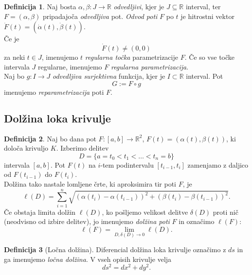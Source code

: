 \documentclass[11pt]{article}
\theoremstyle{definition}
\newtheorem{definicija}{Definicija}[section]
\theoremstyle{definition}
\theoremstyle{definition}
\theoremstyle{theorem}
\begin{document}
\begin{definicija}

Naj bosta $\alpha, \beta: J \rightarrow \mathbb{R}$ \textit{odvedljivi}, kjer je $J \subseteq \mathbb{R}$ interval, ter $F = (\alpha, \beta)$ pripadajoča \textit{odvedljiva} pot. \textit{Odvod poti} $F$ po $t$ je hitrostni vektor $\dot{F}(t) = (\dot{\alpha}(t), \dot{\beta}(t))$. \\
Če je 
$$\dot{F}(t) \neq (0, 0)$$ 
za neki $t \in J$, imenujemo $t$ \textit{regularna točka} parametrizacije $F$. Če so vse točke intervala $J$ regularne, imenujemo $F$ \textit{regularna parametrizacija}. \\
Naj bo $g: I \rightarrow J$ \textit{odvedljiva surjektivna} funkcija, kjer je $I \subset \mathbb{R}$ interval. Pot
$$G := F \circ g$$
imenujemo \textit{reparametrizacija} poti $F$.

\end{definicija}
\vspace{0.5cm}


\subsection{Dolžina loka krivulje}
\vspace{0.5cm}

\begin{definicija}

Naj bo dana pot $F:[a, b] \rightarrow \mathbb{R}^2$, $F(t) = (\alpha(t), \beta(t))$, ki določa krivuljo $K$. Izberimo delitev
$$D = \{a = t_0 < t_1 < \ldots < t_n = b\}$$
intervala $[a, b]$. Pot $F(t)$ na $i$-tem podintervalu $[t_{i-1}, t_i]$ zamenjamo z daljico od $F(t_{i-1})$ do $F(t_i)$. \\
Dolžina tako nastale lomljene črte, ki aproksimira tir poti $F$, je 
$$\ell(D) = \sum_{i = 1}^{n} \sqrt{ (\alpha(t_i) - \alpha(t_{i-1}))^2 + (\beta(t_i) - \beta(t_{i-1}))^2 }.$$
Če obstaja limita dolžin $\ell(D)$, ko pošljemo velikost delitve $\delta(D)$ proti nič (neodvisno od izbire delitev), jo imenujemo \textit{dolžina poti} $F$ in označimo $\ell(F)$:
$$\ell(F) = \lim_{D,\delta(D) \rightarrow 0} \ell(D).$$

\end{definicija}
\vspace{0.5cm}

\begin{definicija}[Ločna dolžina]

Diferencial dolžina loka krivulje označimo z $ds$ in ga imenujemo \textit{ločna dolžina}. V vseh opisih krivulje velja 
$$ds^2 = dx^2 + dy^2.$$

\end{definicija}
\vspace{0.5cm}
\end{document}
